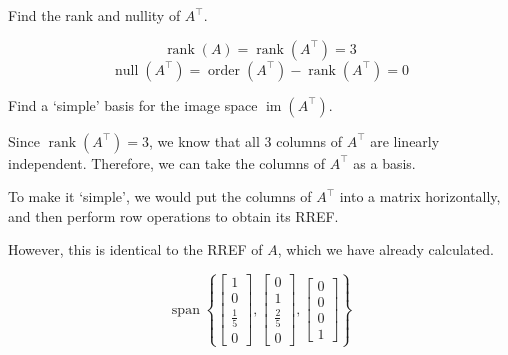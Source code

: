 \documentclass[a4paper,11pt]{exam}
\begin{document}
\begin{questions}
\begin{parts}
\begin{subparts}
\begin{solution}
            \end{solution}
            \subpart Find the rank and nullity of $A^{\top}$.

            \begin{solution}
                \[ \operatorname{rank}(A) = \operatorname{rank}(A^{\top}) = 3 \]
                \[ \operatorname{null}(A^\top) = \operatorname{order}(A^\top) - \operatorname{rank}(A^\top) = 0 \]
            \end{solution}

            \subpart Find a `simple' basis for the image space $\operatorname{im}\left(A^{\top}\right)$.

            \begin{solution}
                Since $\operatorname{rank}(A^\top) = 3$, we know that all $3$ columns of $A^\top$
                are linearly independent. Therefore, we can take the columns of $A^\top$ as a basis.

                To make it `simple', we would put the columns of $A^\top$ into a matrix horizontally,
                and then perform row operations to obtain its RREF.

                However, this is identical to the RREF of $A$, which we have already calculated.

                \[
                    \operatorname{span}\left\{\left[\begin{array}{c}
                            1           \\
                            0           \\
                            \frac{1}{5} \\
                            0
                        \end{array}\right],\left[\begin{array}{c}
                            0           \\
                            1           \\
                            \frac{2}{5} \\
                            0
                        \end{array}\right],\left[\begin{array}{c}
                            0 \\
                            0 \\
                            0 \\
                            1
                        \end{array}\right]\right\}
                \]
            \end{solution}


\end{subparts}
\end{parts}
\end{questions}
\end{document}
